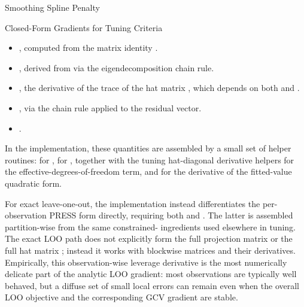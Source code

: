 \begin{Section}{Smoothing Spline Penalty}
\begin{SubSection}{Closed-Form Gradients for Tuning Criteria}
\begin{itemize}
\item{} , computed from the
matrix identity
.
\item{} , derived from
 via the eigendecomposition
chain rule.
\item{} , the derivative of the
trace of the hat matrix
,
which depends on both
 and
.
\item{} ,
via the chain rule applied to the residual vector.
\item{} .

\end{itemize}

In the implementation, these quantities are assembled by a small set of
helper routines:  for
, 
for ,
 together with the tuning hat-diagonal
derivative helpers for the effective-degrees-of-freedom term, and
 for the derivative of the fitted-value
quadratic form.

For exact leave-one-out, the implementation instead differentiates the
per-observation PRESS form directly, requiring both
 and
. The latter is assembled
partition-wise from the same constrained- ingredients used
elsewhere in tuning. The exact LOO path does not explicitly form the full
projection matrix  or the full hat matrix ;
instead it works with blockwise matrices
and their derivatives. Empirically, this observation-wise leverage
derivative is the most numerically delicate part of the analytic LOO
gradient: most observations are typically well behaved, but a diffuse set of
small local errors can remain even when the overall LOO objective and the
corresponding GCV gradient are stable.


\end{SubSection}
\end{Section}
